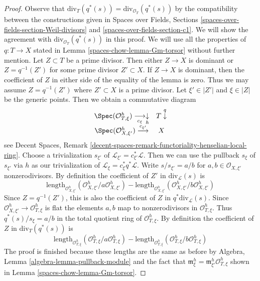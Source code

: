\begin{proof}
Observe that $\text{div}_T(q^*(s)) = \text{div}_{\mathcal{O}_T}(q^*(s))$
by the compatibility between the constructions given in
Spaces over Fields, Sections
\ref{spaces-over-fields-section-Weil-divisors} and
\ref{spaces-over-fields-section-c1}.
We will show the agreement with $\text{div}_{\mathcal{O}_T}(q^*(s))$
in this proof.
We will use all the properties of $q : T \to X$ stated in
Lemma \ref{spaces-chow-lemma-Gm-torsor} without further mention.
Let $Z \subset T$ be a prime divisor.
Then either $Z \to X$ is dominant or $Z = q^{-1}(Z')$ for some
prime divisor $Z' \subset X$.
If $Z \to X$ is dominant, then the coefficient of $Z$ in
either side of the equality of the lemma is zero.
Thus we may assume $Z = q^{-1}(Z')$ where $Z' \subset X$
is a prime divisor.
Let $\xi' \in |Z'|$ and $\xi \in |Z|$ be the generic points.
Then we obtain a commutative diagram
$$
\begin{array}{cc}\Spec(\mathcal{O}_{T, \xi}^h) \underset{c_\xi}{\longrightarrow}\underset{h}{\downarrow} & T \overset{q}{\downarrow} \\ \Spec(\mathcal{O}_{X, \xi'}^h) \overset{c_{\xi'}}{\longrightarrow} & X\end{array}
$$
see Decent Spaces, Remark
\ref{decent-spaces-remark-functoriality-henselian-local-ring}.
Choose a trivialization $s_{\xi'}$ of
$\mathcal{L}_{\xi'} = c_{\xi'}^*\mathcal{L}$.
Then we can use the pullback $s_\xi$ of $s_{\xi'}$ via $h$
as our trivialization of $\mathcal{L}_\xi = c_\xi^* q^*\mathcal{L}$.
Write $s/s_{\xi'} = a/b$ for $a, b \in \mathcal{O}_{X, \xi'}$ nonzerodivisors.
By definition the coefficient of $Z'$ in
$\text{div}_\mathcal{L}(s)$ is
$$
\text{length}_{\mathcal{O}_{X, \xi'}^h}(
\mathcal{O}_{X, \xi'}^h/a \mathcal{O}_{X, \xi'}^h)
-
\text{length}_{\mathcal{O}_{X, \xi'}^h}(
\mathcal{O}_{X, \xi'}^h/b \mathcal{O}_{X, \xi'}^h)
$$
Since $Z = q^{-1}(Z')$, this is also the coefficient of $Z$ in
$q^*\text{div}_\mathcal{L}(s)$. Since
$\mathcal{O}_{X, \xi'}^h \to \mathcal{O}_{T, \xi}^h$
is flat the elements $a, b$ map to nonzerodivisors in
$\mathcal{O}_{T, \xi}^h$. Thus $q^*(s)/s_\xi = a/b$ in the total quotient
ring of $\mathcal{O}_{T, \xi}^h$. By definition the coefficient of
$Z$ in $\text{div}_T(q^*(s))$ is
$$
\text{length}_{\mathcal{O}_{T, \xi}^h}(
\mathcal{O}_{T, \xi}^h/a \mathcal{O}_{T, \xi}^h)
-
\text{length}_{\mathcal{O}_{T, \xi}^h}(
\mathcal{O}_{T, \xi}^h/b \mathcal{O}_{T, \xi}^h)
$$
The proof is finished because these lengths are the same as before
by Algebra, Lemma \ref{algebra-lemma-pullback-module} and the
fact that $\mathfrak m_\xi^h = \mathfrak m_{\xi'}^h\mathcal{O}_{T, \xi}^h$
shown in Lemma \ref{spaces-chow-lemma-Gm-torsor}.
\end{proof}

